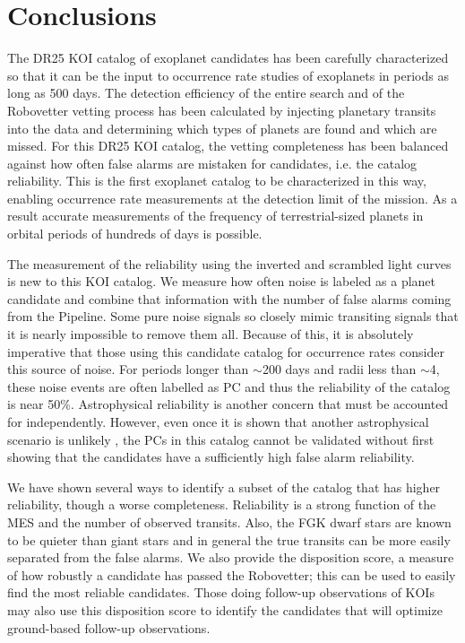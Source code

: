 

\section{Conclusions}

The DR25 KOI catalog of exoplanet candidates has been carefully characterized so that it can be the input to occurrence rate studies of exoplanets in periods as long as 500 days. The detection efficiency of the entire search \citep{Burke2017b,Christiansen2017} and of the Robovetter vetting process has been calculated by injecting planetary transits into the data and determining which types of planets are found and which are missed. For this DR25 KOI catalog, the vetting completeness has been balanced against how often false alarms are mistaken for candidates, i.e. the catalog reliability. This is the first \Kepler{} exoplanet catalog to be characterized in this way, enabling occurrence rate measurements at the detection limit of the mission.  As a result accurate measurements of the frequency of terrestrial-sized planets in orbital periods of hundreds of days is possible.

The measurement of the reliability using the inverted and scrambled light curves is new to this KOI catalog. We measure how often noise is labeled as a planet candidate and combine that information with the number of false alarms coming from the \Kepler{} Pipeline. Some pure noise signals so closely mimic transiting signals that it is nearly impossible to remove them all. Because of this, it is absolutely imperative that those using this candidate catalog for occurrence rates consider this source of noise. For periods longer than $\sim$200 days and radii less than $\sim$4\Rearth, these noise events are often labelled as PC and thus the reliability of the catalog is near 50\%.  Astrophysical reliability is another concern that must be accounted for independently.  However, even once it is shown that another astrophysical scenario is unlikely \citep[as was done for the DR24 KOIs in ][]{Morton2017}, the PCs in this catalog cannot be validated without first showing that the candidates have a sufficiently high false alarm reliability. 

We have shown several ways to identify a subset of the catalog that has higher reliability, though a worse completeness. Reliability is a strong function of the MES and the number of observed transits. Also, the FGK dwarf stars are known to be quieter than giant stars and in general the true transits can be more easily separated from the false alarms. We also provide the disposition score, a measure of how robustly a candidate has passed the Robovetter; this can be used to easily find the most reliable candidates. Those doing follow-up observations of KOIs may also use this disposition score to identify the candidates that will optimize ground-based follow-up observations.  

